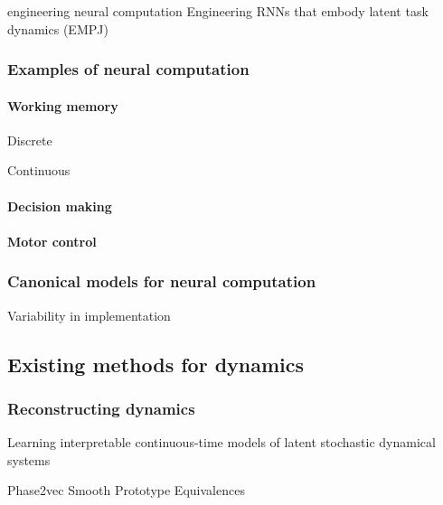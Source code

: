 \documentclass{article}
\theoremstyle{definition} \newtheorem{definition}{Definition}  \newtheorem{example}{Example}
\theoremstyle{remark} \newtheorem{remark}{Remark}
\newcounter{ct}
\begin{document}
engineering neural computation \citep{eliasmith2003neuralengineering, eliasmith2005unified, eliasmith2010describe} \citep{beiran2023rnns}
Engineering RNNs that embody latent task dynamics (EMPJ) \citep{pollock2020engineering}


\subsubsection{Examples of neural computation}
\paragraph{Working memory}
Discrete 

Continuous 

\paragraph{Decision making}

\paragraph{Motor control}
\citep{wang2022representation}

\subsubsection{Canonical models for neural computation}
\citep{chirimuuta2014minimal}

Variability in implementation



\subsection{Existing methods for dynamics}
\subsubsection{Reconstructing dynamics}
Learning interpretable continuous-time models of latent stochastic dynamical systems \citep{duncker2019learning}

Phase2vec \citep{ricci2022phase2vec}
\citep{moriel2024timewarpattend}
Smooth Prototype Equivalences \citep{friedman2025characterizing}
\end{document}
